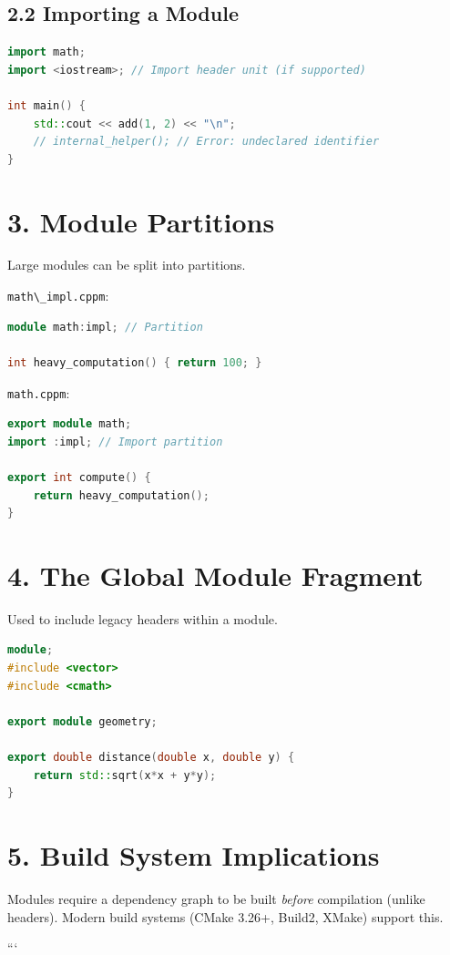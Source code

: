 \hypertarget{importing-a-module}{%
\subsection{2.2 Importing a Module}\label{importing-a-module}}

\begin{lstlisting}[language={C++}]
import math;
import <iostream>; // Import header unit (if supported)

int main() {
    std::cout << add(1, 2) << "\n";
    // internal_helper(); // Error: undeclared identifier
}
\end{lstlisting}

\hypertarget{module-partitions}{%
\section{3. Module Partitions}\label{module-partitions}}

Large modules can be split into partitions.

\passthrough{\lstinline!math\_impl.cppm!}:

\begin{lstlisting}[language={C++}]
module math:impl; // Partition

int heavy_computation() { return 100; }
\end{lstlisting}

\passthrough{\lstinline!math.cppm!}:

\begin{lstlisting}[language={C++}]
export module math;
import :impl; // Import partition

export int compute() {
    return heavy_computation();
}
\end{lstlisting}

\hypertarget{the-global-module-fragment}{%
\section{4. The Global Module
Fragment}\label{the-global-module-fragment}}

Used to include legacy headers within a module.

\begin{lstlisting}[language={C++}]
module;
#include <vector> 
#include <cmath>

export module geometry;

export double distance(double x, double y) {
    return std::sqrt(x*x + y*y);
}
\end{lstlisting}

\hypertarget{build-system-implications}{%
\section{5. Build System Implications}\label{build-system-implications}}

Modules require a dependency graph to be built \emph{before} compilation
(unlike headers). Modern build systems (CMake 3.26+, Build2, XMake)
support this.

```
